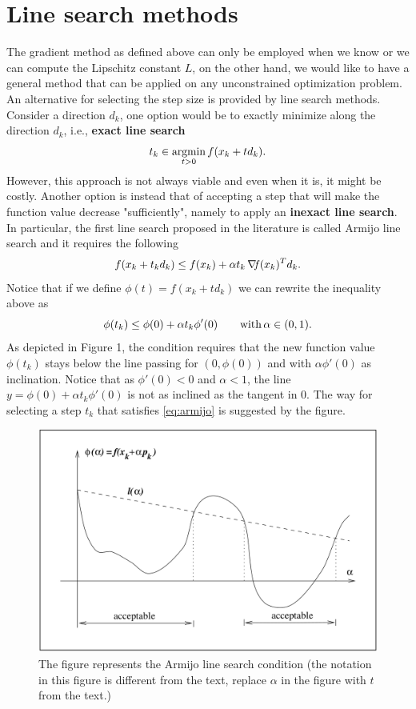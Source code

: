 \documentclass[10pt,a4paper]{article}
\begin{document}
\section{Line search methods}
The gradient method as defined above can only be employed when we know or we can compute the Lipschitz constant $L$, on the other hand, we would like to have a general method that can be applied on any unconstrained optimization problem. An alternative for selecting the step size is provided by line search methods. Consider a direction $d_k$, one option would be to exactly minimize along the direction $d_k$, i.e., \textbf{exact line search}
\begin{equation*}
	t_k \in \operatorname*{argmin}_{t>0} f(x_k+t d_k).
\end{equation*}
However, this approach is not always viable and even when it is, it might be costly. Another option is instead that of accepting a step that will make the function value decrease "sufficiently", namely to apply an \textbf{inexact line search}. In particular, the first line search proposed in the literature is called Armijo line search \cite{armijo66a} and it requires the following
\begin{equation}\label{eq:armijo}
	f(x_k +t_k d_k) \leq f(x_k) + \alpha t_k\operatorname*{\mathit{\nabla \!f}}(x_k)^Td_k.
\end{equation}
Notice that if we define $\phi(t)=f(x_k+td_k)$ we can rewrite the inequality above as
\begin{equation*}
\phi(t_k) \leq \phi(0) + \alpha t_k \phi'(0) \qquad \mathord{\mathrm{with }}\, \alpha \in (0,1).
\end{equation*}
As depicted in Figure 1, the condition requires that the new function value $\phi(t_k)$ stays below the line passing for $(0,\phi(0))$ and with $\alpha\phi'(0)$ as inclination. Notice that as $\phi'(0)<0$ and $\alpha<1$, the line $y=\phi(0) +\alpha t_k \phi'(0)$ is not as inclined as the tangent in 0. The way for selecting a step $t_k$ that satisfies \eqref{eq:armijo} is suggested by the figure.
\begin{figure}
	\centering
	\includegraphics[width=0.5\linewidth]{lines}
	\caption{The figure represents the Armijo line search condition (the notation in this figure is different from the text, replace $\alpha$ in the figure with $t$ from the text.)}
\end{figure}
\end{document}
